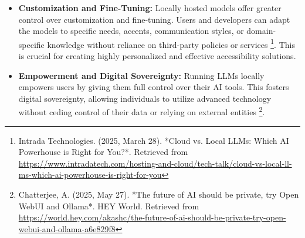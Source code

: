\begin{itemize}
    \item \textbf{Customization and Fine-Tuning:} Locally hosted models offer greater control over customization and fine-tuning. Users and developers can adapt the models to specific needs, accents, communication styles, or domain-specific knowledge without reliance on third-party policies or services \footnote{Intrada Technologies. (2025, March 28). *Cloud vs. Local LLMs: Which AI Powerhouse is Right for You?*. Retrieved from \url{https://www.intradatech.com/hosting-and-cloud/tech-talk/cloud-vs-local-ll-ms-which-ai-powerhouse-is-right-for-you}}. This is crucial for creating highly personalized and effective accessibility solutions.
    \item \textbf{Empowerment and Digital Sovereignty:} Running LLMs locally empowers users by giving them full control over their AI tools. This fosters digital sovereignty, allowing individuals to utilize advanced technology without ceding control of their data or relying on external entities \footnote{Chatterjee, A. (2025, May 27). *The future of AI should be private, try Open WebUI and Ollama*. HEY World. Retrieved from \url{https://world.hey.com/akashc/the-future-of-ai-should-be-private-try-open-webui-and-ollama-a6e829f8}}.
\end{itemize}

